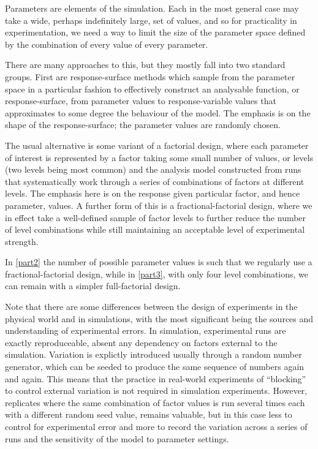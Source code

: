Parameters are elements of the simulation. Each in the most general case may take a wide, perhaps indefinitely large, set of values, and so for practicality in experimentation, we need a way to limit the size of the parameter space defined by the combination of every value of every parameter. 

There are many approaches to this, but they mostly fall into two standard groups. First are response-surface methods which sample from the parameter space in a particular fashion to effectively construct an analysable function, or response-surface, from parameter values to response-variable values that approximates to some degree the behaviour of the model. The emphasis is on the shape of the response-surface; the parameter values are randomly chosen.

The usual alternative is some variant of a factorial design, where each parameter of interest is represented by a factor taking some small number of values, or levels (two levels being most common) and the analysis model constructed from runs that systematically work through a series of combinations of factors at different levels. The emphasis here is on the response given particular factor, and hence parameter, values. A further form of this is a fractional-factorial design, where we in effect take a well-defined sample of factor levels to further reduce the number of level combinations while still maintaining an acceptable level of experimental strength.

In \cref{part2} the number of possible parameter values is such that we regularly use a fractional-factorial design, while in \cref{part3}, with only four level combinations, we can remain with a simpler full-factorial design.

Note that there are some differences between the design of experiments in the physical world and in simulations, with the most significant being the sources and understanding of experimental errors. In simulation, experimental runs are exactly reproduceable, absent any dependency on factors external to the simulation. Variation is explictly introduced usually through a random number generator, which can be seeded to produce the same sequence of numbers again and again. This means that the practice in real-world experiments of ``blocking'' to control external variation is not required in simulation experiments. However, \gls{replicate}s where the same combination of factor values is run several times each with a different random seed value, remains valuable, but in this case less to control for experimental error and more to record the variation across a series of runs and the sensitivity of the model to parameter settings.
